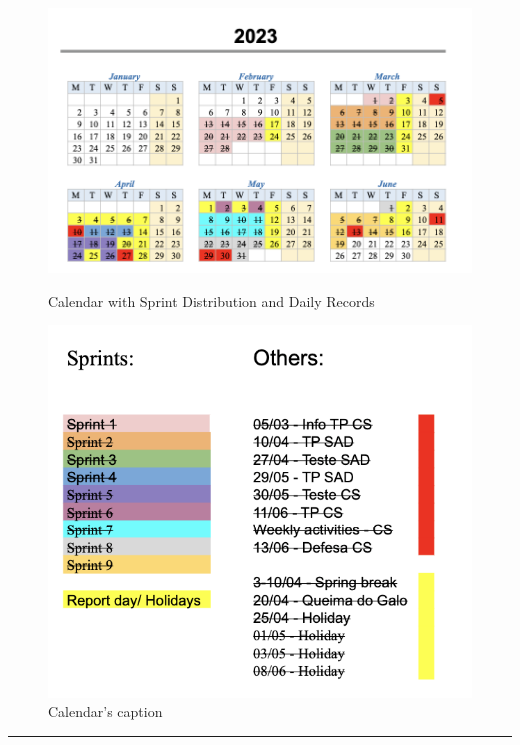 \begin{figure}[htbp]
	\centering
	
	\begin{minipage}[b]{0.55\textwidth}
		\centering
		\includegraphics[width=\linewidth]{figures/cal.png}
		\caption{Calendar with Sprint Distribution and Daily Records}
		\label{fig:cal}
	\end{minipage}
	\hfill
	\begin{minipage}[b]{0.40\textwidth}
		\centering
		\includegraphics[width=\linewidth]{figures/leg.png}
		\caption{Calendar's caption}
		\label{fig:cap}
	\end{minipage}

\end{figure}

\noindent \rule{\linewidth}{0.4pt}
\newline
